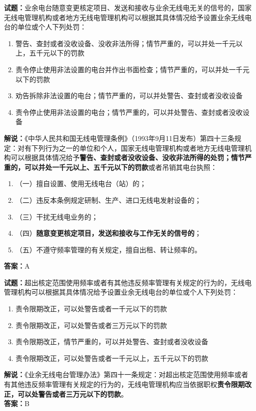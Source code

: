 \documentclass{ctexbook}
\begin{document}
\noindent\textbf{试题：}业余电台随意变更核定项目、发送和接收与业余无线电无关的信号的，国家无线电管理机构或者地方无线电管理机构可以根据其具体情况给予设置业余无线电台的单位或个人下列处罚：
\begin{enumerate}[leftmargin=3em]
	\item  警告、查封或者没收设备、没收非法所得；情节严重的，可以并处一千元以上，五千元以下的罚款
	\item  责令停止使用非法设置的电台并作出书面检查；情节严重的，可以并处一千元以下的罚款
	\item  劝告拆除非法设置的电台；情节严重的，可以并处警告、查封或者没收设备
	\item  责令停止使用非法设置的电台；情节严重的，可以并处警告、查封或者没收设备
\end{enumerate}
\noindent\textbf{解说：}《中华人民共和国无线电管理条例》（1993年9月11日发布）第四十三条规定：对有下列行为之一的单位和个人，国家无线电管理机构或者地方无线电管理机构可以根据具体情况给予\textbf{警告、查封或者没收设备、没收非法所得的处罚；情节严重的，可以并处一千元以上、五千元以下的罚款}或者吊销其电台执照：
\begin{enumerate}[leftmargin=3em, label=]
	\item（一）擅自设置、使用无线电台（站）的；
	\item（二）违反本条例规定研制、生产、进口无线电发射设备的；
	\item（三）干扰无线电业务的；
	\item（四）\textbf{随意变更核定项目，发送和接收与工作无关的信号的}；
	\item（五）不遵守频率管理的有关规定，擅自出租、转让频率的。
\end{enumerate}
\textbf{答案：}A


\bigskip


\noindent\textbf{试题：}超出核定范围使用频率或者有其他违反频率管理有关规定的行为的，无线电管理机构可以根据其具体情况给予设置业余无线电台的单位或个人下列处罚：
\begin{enumerate}[leftmargin=3em]
	\item 责令限期改正，可以处警告或者一千元以下的罚款
	\item 责令限期改正，可以处警告或者三万元以下的罚款
	\item 责令限期改正，情节严重的，可以并处警告、查封或者没收设备
	\item 责令限期改正，可以处警告或者一千元以上，五千元以下的罚款
\end{enumerate}
\noindent\textbf{解说：}《业余无线电台管理办法》第四十一条规定：对超出核定范围使用频率或者有其他违反频率管理有关规定的行为的，无线电管理机构应当依据职权\textbf{责令限期改正，可以处警告或者三万元以下的罚款}。\\\textbf{答案：}B
\end{document}
